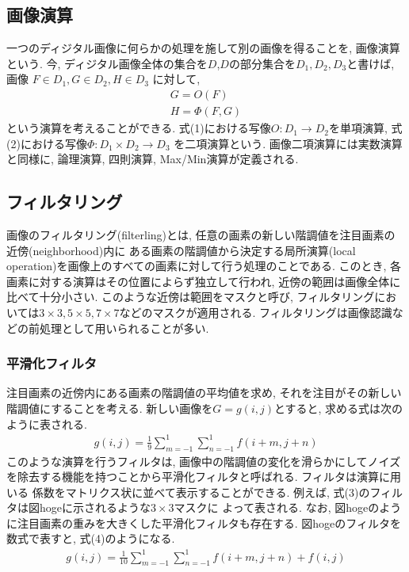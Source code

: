 \documentclass[a4paper,11pt,uplatex]{jsarticle}
\begin{document}
\subsection{画像演算}
一つのディジタル画像に何らかの処理を施して別の画像を得ることを, 画像演算という.
今, ディジタル画像全体の集合を$D$,$D$の部分集合を$D_1,D_2,D_3$と書けば, 画像 $F \in D_1, G \in D_2, H \in D_3$
に対して,
\begin{align}
  G = O(F) \\
  H = \Phi(F,G)
\end{align}
という演算を考えることができる. 式(1)における写像$O: D_1 \to D_2$を単項演算, 式(2)における写像$\Phi: D_1 \times D_2 \to D_3$
を二項演算という. 画像二項演算には実数演算と同様に, 論理演算, 四則演算, Max/Min演算が定義される.
\subsection{フィルタリング}
画像のフィルタリング(filterling)とは, 任意の画素の新しい階調値を注目画素の近傍(neighborhood)内に
ある画素の階調値から決定する局所演算(local operation)を画像上のすべての画素に対して行う処理のことである.
このとき, 各画素に対する演算はその位置によらず独立して行われ, 近傍の範囲は画像全体に比べて十分小さい. このような近傍は範囲をマスクと呼び,
フィルタリングにおいては$3\times3, 5\times5, 7\times7$などのマスクが適用される. フィルタリングは画像認識などの前処理として用いられることが多い.
\subsubsection{平滑化フィルタ}
注目画素の近傍内にある画素の階調値の平均値を求め, それを注目がその新しい階調値にすることを考える. 新しい画像を$G = g(i,j)$とすると, 求める式は次のように表される.
\begin{align}
  g(i,j) = \frac{1}{9} \sum_{m=-1}^{1} \sum_{n=-1}^{1} f(i+m, j+n)
\end{align}
このような演算を行うフィルタは, 画像中の階調値の変化を滑らかにしてノイズを除去する機能を持つことから平滑化フィルタと呼ばれる. フィルタは演算に用いる
係数をマトリクス状に並べて表示することができる. 例えば, 式(3)のフィルタは図hogeに示されるような$3\times3$マスクに
よって表される. なお, 図hogeのように注目画素の重みを大きくした平滑化フィルタも存在する. 図hogeのフィルタを数式で表すと,
式(4)のようになる.
\begin{align}
  g(i,j) = \frac{1}{10} { \sum_{m=-1}^{1} \sum_{n=-1}^{1} f(i+m, j+n)+f(i,j) }
\end{align}
\end{document}

